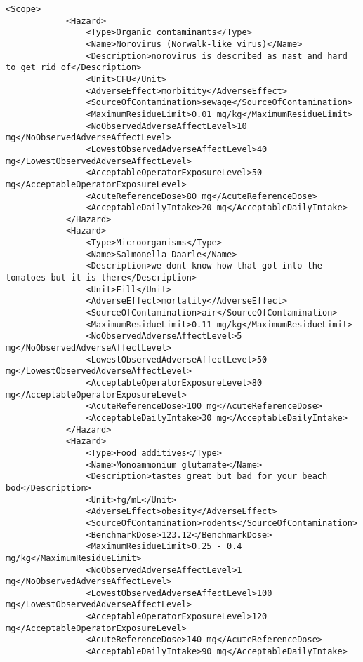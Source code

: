 \begin{lstlisting}[language=RAKIP, caption={Example of DoseResponseModel}]
        <Scope>
            <Hazard>
                <Type>Organic contaminants</Type>
                <Name>Norovirus (Norwalk-like virus)</Name>
                <Description>norovirus is described as nast and hard to get rid of</Description>
                <Unit>CFU</Unit>
                <AdverseEffect>morbitity</AdverseEffect>
                <SourceOfContamination>sewage</SourceOfContamination>
                <MaximumResidueLimit>0.01 mg/kg</MaximumResidueLimit>
                <NoObservedAdverseAffectLevel>10 mg</NoObservedAdverseAffectLevel>
                <LowestObservedAdverseAffectLevel>40 mg</LowestObservedAdverseAffectLevel>
                <AcceptableOperatorExposureLevel>50 mg</AcceptableOperatorExposureLevel>
                <AcuteReferenceDose>80 mg</AcuteReferenceDose>
                <AcceptableDailyIntake>20 mg</AcceptableDailyIntake>
            </Hazard>
            <Hazard>
                <Type>Microorganisms</Type>
                <Name>Salmonella Daarle</Name>
                <Description>we dont know how that got into the tomatoes but it is there</Description>
                <Unit>Fill</Unit>
                <AdverseEffect>mortality</AdverseEffect>
                <SourceOfContamination>air</SourceOfContamination>
                <MaximumResidueLimit>0.11 mg/kg</MaximumResidueLimit>
                <NoObservedAdverseAffectLevel>5 mg</NoObservedAdverseAffectLevel>
                <LowestObservedAdverseAffectLevel>50 mg</LowestObservedAdverseAffectLevel>
                <AcceptableOperatorExposureLevel>80 mg</AcceptableOperatorExposureLevel>
                <AcuteReferenceDose>100 mg</AcuteReferenceDose>
                <AcceptableDailyIntake>30 mg</AcceptableDailyIntake>
            </Hazard>
            <Hazard>
                <Type>Food additives</Type>
                <Name>Monoammonium glutamate</Name>
                <Description>tastes great but bad for your beach bod</Description>
                <Unit>fg/mL</Unit>
                <AdverseEffect>obesity</AdverseEffect>
                <SourceOfContamination>rodents</SourceOfContamination>
                <BenchmarkDose>123.12</BenchmarkDose>
                <MaximumResidueLimit>0.25 - 0.4 mg/kg</MaximumResidueLimit>
                <NoObservedAdverseAffectLevel>1 mg</NoObservedAdverseAffectLevel>
                <LowestObservedAdverseAffectLevel>100 mg</LowestObservedAdverseAffectLevel>
                <AcceptableOperatorExposureLevel>120 mg</AcceptableOperatorExposureLevel>
                <AcuteReferenceDose>140 mg</AcuteReferenceDose>
                <AcceptableDailyIntake>90 mg</AcceptableDailyIntake>

\end{lstlisting}
